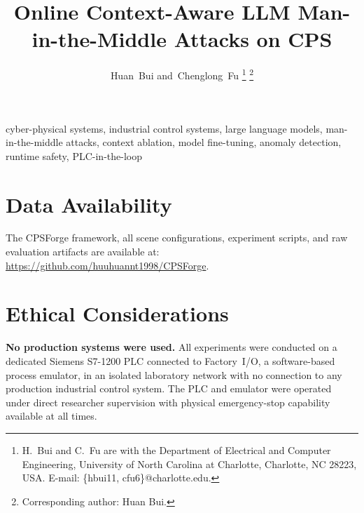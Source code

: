\documentclass[journal]{IEEEtran}
\begin{document}
\title{Online Context-Aware LLM Man-in-the-Middle Attacks on CPS}

\author{Huan~Bui
  and~Chenglong~Fu%
  \thanks{H.~Bui and C.~Fu are with the Department of Electrical and Computer
    Engineering, University of North Carolina at Charlotte, Charlotte, NC 28223,
    USA. E-mail: \{hbui11, cfu6\}@charlotte.edu.}%
  \thanks{Corresponding author: Huan Bui.}%
}

\maketitle



\begin{IEEEkeywords}
cyber-physical systems, industrial control systems, large language models, man-in-the-middle attacks, context ablation, model fine-tuning, anomaly detection, runtime safety, PLC-in-the-loop
\end{IEEEkeywords}












\section*{Data Availability}
The CPSForge framework, all scene configurations, experiment scripts, and raw evaluation artifacts are available at: \url{https://github.com/huuhuannt1998/CPSForge}.

\section*{Ethical Considerations}
\textbf{No production systems were used.} All experiments were conducted on a dedicated Siemens S7-1200 PLC connected to Factory~I/O, a software-based process emulator, in an isolated laboratory network with no connection to any production industrial control system. The PLC and emulator were operated under direct researcher supervision with physical emergency-stop capability available at all times.
\end{document}
